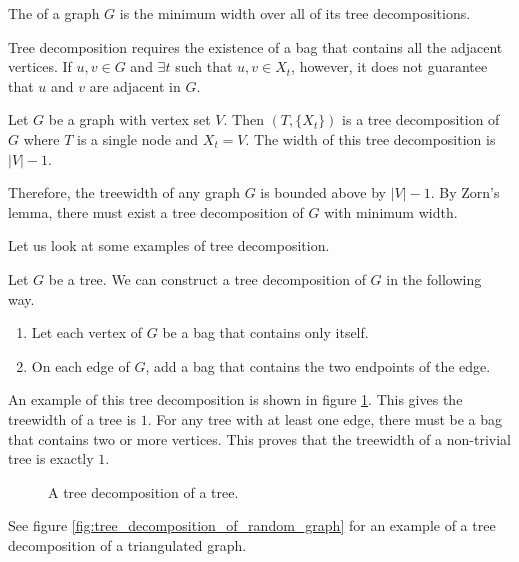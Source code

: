\begin{definition}[Treewidth]
	The  of a graph $G$ is the minimum width over all of its tree decompositions.
\end{definition}

Tree decomposition requires the existence of a bag that contains all the adjacent vertices. 
If $u,v \in G$ and $\exists t$ such that $ u, v \in X_t $, however, it does not guarantee that $u$ and $v$ are adjacent in $G$.

\begin{example}
	Let $G$ be a graph with vertex set $V$. Then $(T, \{X_t\})$ is a tree decomposition of $G$ where $T$ is a single node and $X_t = V$. The width of this tree decomposition is $|V| - 1$.

	Therefore, the treewidth of any graph $G$ is bounded above by $|V| - 1$.
	By Zorn's lemma, there must exist a tree decomposition of $G$ with minimum width.
\end{example}

Let us look at some examples of tree decomposition.

\begin{example}
	Let $G$ be a tree. We can construct a tree decomposition of $G$ in the following way.
	\begin{enumerate}
		\item Let each vertex of $G$ be a bag that contains only itself.
		\item On each edge of $G$, add a bag that contains the two endpoints of the edge.
	\end{enumerate}
	An example of this tree decomposition is shown in figure \ref{fig:tree_decomposition_of_tree}. 
	This gives the treewidth of a tree is $1$. 
	For any tree with at least one edge, there must be a bag that contains two or more vertices. This proves that the treewidth of a non-trivial tree is exactly $1$.
\end{example}

\begin{figure}[ht]
	\centering
	
	\caption{A tree decomposition of a tree.}
	\label{fig:tree_decomposition_of_tree}
\end{figure}

\begin{example}
	See figure \ref{fig:tree_decomposition_of_random_graph} for an example of a tree decomposition of a triangulated graph.
\end{example}

